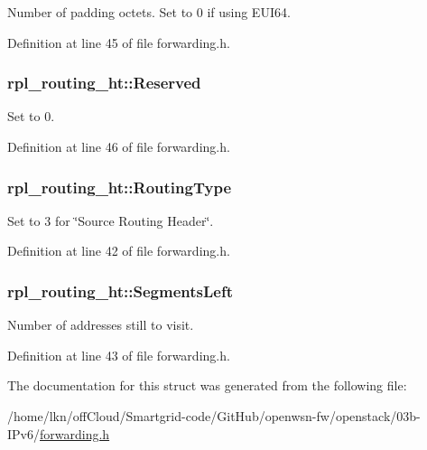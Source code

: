 Number of padding octets. Set to 0 if using E\+U\+I64. 



Definition at line 45 of file forwarding.\+h.

\subsubsection[{\texorpdfstring{Reserved}{Reserved}}]{ rpl\+\_\+routing\+\_\+ht\+::\+Reserved}\hypertarget{structrpl__routing__ht_a6a8dea81048a7de7d76a0e500f53b886}{}\label{structrpl__routing__ht_a6a8dea81048a7de7d76a0e500f53b886}


Set to 0. 



Definition at line 46 of file forwarding.\+h.

\subsubsection[{\texorpdfstring{Routing\+Type}{RoutingType}}]{ rpl\+\_\+routing\+\_\+ht\+::\+Routing\+Type}\hypertarget{structrpl__routing__ht_a1e9bde8dde29dd53ab35fe797d850768}{}\label{structrpl__routing__ht_a1e9bde8dde29dd53ab35fe797d850768}


Set to 3 for \char`\"{}\+Source Routing Header\char`\"{}. 



Definition at line 42 of file forwarding.\+h.

\subsubsection[{\texorpdfstring{Segments\+Left}{SegmentsLeft}}]{ rpl\+\_\+routing\+\_\+ht\+::\+Segments\+Left}\hypertarget{structrpl__routing__ht_acce5a43a26b640f88f370dbd323e49fd}{}\label{structrpl__routing__ht_acce5a43a26b640f88f370dbd323e49fd}


Number of addresses still to visit. 



Definition at line 43 of file forwarding.\+h.



The documentation for this struct was generated from the following file\+:\begin{DoxyCompactItemize}
\item 
/home/lkn/off\+Cloud/\+Smartgrid-\/code/\+Git\+Hub/openwsn-\/fw/openstack/03b-\/\+I\+Pv6/\hyperlink{forwarding_8h}{forwarding.\+h}\end{DoxyCompactItemize}
